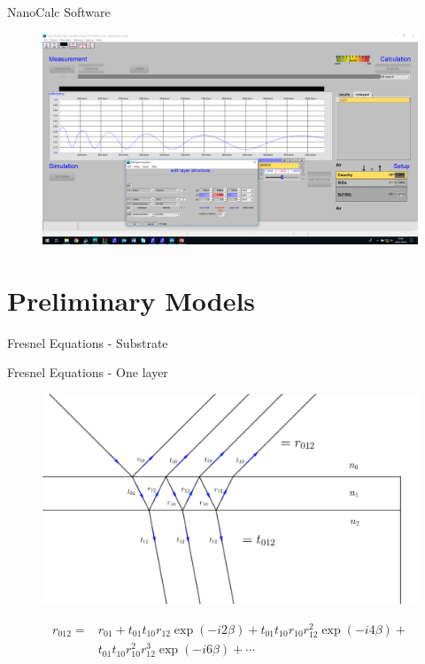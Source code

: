 \documentclass[10pt]{beamer}
\begin{document}
	\begin{frame}{NanoCalc Software}
	
	\begin{figure}
	\includegraphics[width=\textwidth]{nanocalc.png}
	\end{figure}
	
	\end{frame}
	
	\section{Preliminary Models}
	
	\begin{frame}{Fresnel Equations - Substrate}
	
	\end{frame}
	
	\begin{frame}{Fresnel Equations - One layer}
	
	\begin{figure} 
		 \begin{center}
		   \includegraphics[width=\textwidth]{figreflre.png}
		 \end{center}
	\end{figure}
	\begin{align*}
	r_{012} = &r_{01} + t_{01}t_{10}r_{12}\exp(-i2\beta) + t_{01}t_{10}r_{10}r_{12}^2\exp(-i4\beta)+ \\ &t_{01}t_{10}r_{10}^2r_{12}^3\exp(-i6\beta)+ \cdots
	\end{align*} 
	
	\end{frame}
	
\end{document}

